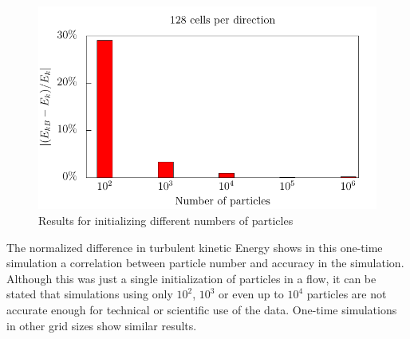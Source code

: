 \documentclass[11pt,a4paper,openany,oneside,parskip=half*]{article}
\begin{document}
\begin{figure}[h]
	\centering
  \includegraphics[width=\textwidth]{./../Simulationsergebnisse/variationPartikelAnzahl//128/kineticEnergy_numberOfParticles.pdf}
	\caption{Results for initializing different numbers of particles}
	\label{kineticEnergy_numberOfParticles}
\end{figure}
The normalized difference in turbulent kinetic Energy shows in this one-time simulation a correlation between particle number and accuracy in the simulation. Although this was just a single initialization of particles in a flow, it can be stated that simulations using only $10^2$, $10^3$ or even up to $10^4$ particles are not accurate enough for technical or scientific use of the data. One-time simulations in other grid sizes show similar results.
\pagebreak
\end{document}
